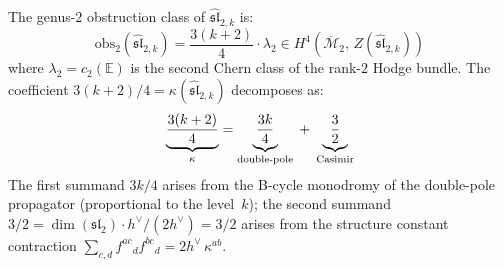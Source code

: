 \begin{theorem}\label{thm:sl2-genus2-curvature}
The genus-$2$ obstruction class of $\widehat{\mathfrak{sl}}_{2,k}$ is:
\begin{equation}\label{eq:sl2-obs2}
\mathrm{obs}_2(\widehat{\mathfrak{sl}}_{2,k})
= \frac{3(k+2)}{4} \cdot \lambda_2
\in H^4(\overline{\mathcal{M}}_2,\, Z(\widehat{\mathfrak{sl}}_{2,k}))
\end{equation}
where $\lambda_2 = c_2(\mathbb{E})$ is the second Chern class of the
rank-$2$ Hodge bundle.  The coefficient $3(k+2)/4 = \kappa(\widehat{\mathfrak{sl}}_{2,k})$
decomposes as:
\begin{equation}\label{eq:sl2-kappa-decomp-genus2}
\underbrace{\frac{3(k+2)}{4}}_{\kappa}
= \underbrace{\frac{3k}{4}}_{\textup{double-pole}}
\;+\; \underbrace{\frac{3}{2}}_{\textup{Casimir}}
\end{equation}
The first summand $3k/4$ arises from the B-cycle monodromy of the
double-pole propagator \textup{(}proportional to the level~$k$\textup{)};
the second summand $3/2 = \dim(\mathfrak{sl}_2) \cdot h^\vee / (2h^\vee)
= 3/2$ arises from the structure constant contraction
$\sum_{c,d} f^{ac}{}_d f^{bc}{}_d = 2h^\vee\, \kappa^{ab}$.
\end{theorem}

